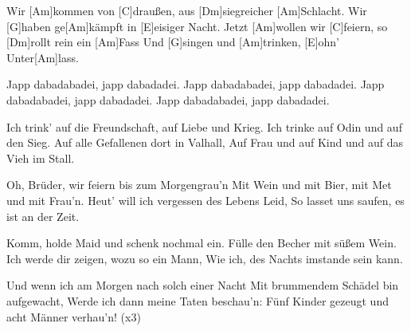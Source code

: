 

\begin{guitar}
	Wir [Am]kommen von [C]draußen, aus [Dm]siegreicher [Am]Schlacht.
	Wir [G]haben ge[Am]kämpft in [E]eisiger Nacht.
	Jetzt [Am]wollen wir [C]feiern, so [Dm]rollt rein ein [Am]Fass
	Und [G]singen und [Am]trinken, [E]ohn' Unter[Am]lass.
	
	Japp dabadabadei, japp dabadadei. Japp dabadabadei, japp dabadadei.
	Japp dabadabadei, japp dabadadei. Japp dabadabadei, japp dabadadei.
	
	Ich trink' auf die Freundschaft, auf Liebe und Krieg.
	Ich trinke auf Odin und auf den Sieg.
	Auf alle Gefallenen dort in Valhall,
	Auf Frau und auf Kind und auf das Vieh im Stall.
	
	 
	
	Oh, Brüder, wir feiern bis zum Morgengrau'n
	Mit Wein und mit Bier, mit Met und mit Frau'n.
	Heut' will ich vergessen des Lebens Leid,
	So lasset uns saufen, es ist an der Zeit.
	
	 
	
	Komm, holde Maid und schenk nochmal ein.
	Fülle den Becher mit süßem Wein.
	Ich werde dir zeigen, wozu so ein Mann,
	Wie ich, des Nachts imstande sein kann.
	
	 
	
	Und wenn ich am Morgen nach solch einer Nacht
	Mit brummendem Schädel bin aufgewacht,
	Werde ich dann meine Taten beschau'n:
	Fünf Kinder gezeugt und acht Männer verhau'n!\vspace{0.3em}
	  (x3)\vspace{-1em}
\end{guitar}
